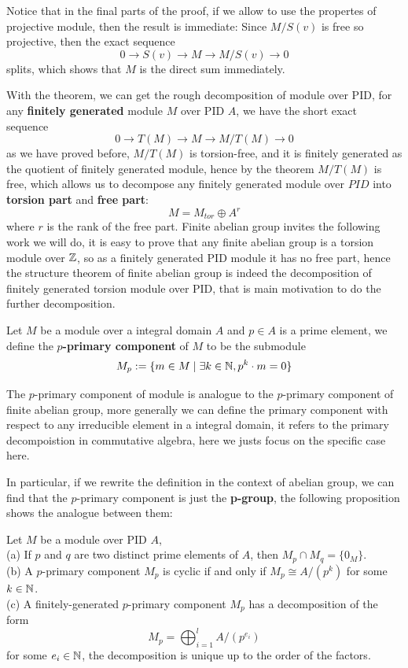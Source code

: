 \begin{remark}
   Notice that in the final parts of the proof, if we allow to use the propertes of projective module, then the result is immediate: Since \(M/S(v)\) is free so projective, then the exact sequence
   \[0 \to S(v) \to M \to M/S(v) \to 0\]
   splits, which shows that \(M\) is the direct sum immediately. 
\end{remark}

With the theorem, we can get the rough decomposition of module over PID, for any \textbf{finitely generated} module \(M\) over PID \(A\), we have the short exact sequence
\[0 \to T(M) \to M \to M/T(M) \to 0\]
as we have proved before, \(M/T(M)\) is torsion-free, and it is finitely generated as the quotient of finitely generated module, hence by the theorem \(M/T(M)\) is free, which allows us to decompose any finitely generated module over \(PID\) into \textbf{torsion part} and \textbf{free part}:
\[M = M_{tor} \oplus A^r\]
where \(r\) is the rank of the free part. Finite abelian group invites the following work we will do, it is easy to prove that any finite abelian group is a torsion module over \(\mathbb{Z}\), so as a finitely generated PID module it has no free part, hence the structure theorem of finite abelian group is indeed the decomposition of finitely generated torsion module over PID, that is main motivation to do the further decomposition.

\begin{definition}
    Let \(M\) be a module over a integral domain \(A\) and \(p \in A\) is a prime element, we define the \textbf{\(p\)-primary component} of \(M\) to be the submodule
    \[M_p : = \{m \in M \mid \exists k \in \mathbb{N}, p^k\cdot m = 0\}\]
\end{definition}
The \(p\)-primary component of module is analogue to the \(p\)-primary component of finite abelian group, more generally we can define the primary component with respect to any irreducible element in a integral domain, it refers to the primary decompoistion in commutative algebra, here we justs focus on the specific case here.

In particular, if we rewrite the definition in the context of abelian group, we can find that the \(p\)-primary component is just the \textbf{p-group}, the following proposition shows the analogue between them:

\begin{proposition}
    Let \(M\) be a module over PID \(A\),\\

    (a) If \(p\) and \(q\) are two distinct prime elements of \(A\), then \(M_p \cap M_q = \{0_M\}\).\\

    (b) A \(p\)-primary component \(M_p\) is cyclic if and only if \(M_p \cong A/(p^k)\) for some \(k \in \mathbb{N}\).\\

    (c) A finitely-generated \(p\)-primary component \(M_p\) has a decomposition of the form
    \[M_p = \bigoplus_{i=1}^l A/(p^{e_i})\]
    for some \(e_i \in \mathbb{N}\), the decomposition is unique up to the order of the factors.
\end{proposition}

